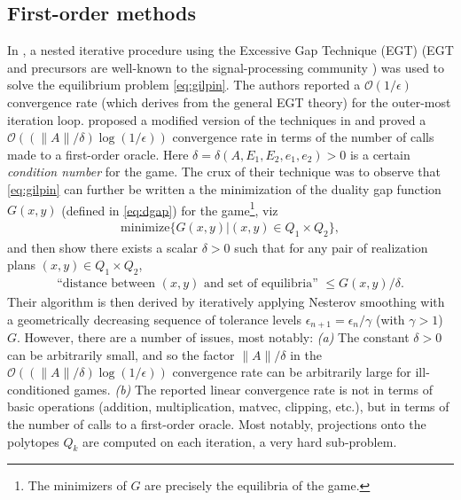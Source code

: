 \documentclass[a4paper,9pt]{extarticle}
\begin{document}
\subsection{First-order methods}
In \cite{hoda2010smoothing}, a nested iterative procedure using the
Excessive Gap Technique (EGT) \cite{nesterov2005excessive} (EGT and
precursors are well-known to the signal-processing community
\cite{NESTA}) was used
to solve the equilibrium problem \eqref{eq:gilpin}.
The authors reported a $\mathcal{O}(1/\epsilon)$ convergence rate
(which derives from the general EGT theory) for the outer-most
iteration loop.
\cite{gilpinfirst} proposed a modified version of the techniques in
\cite{hoda2010smoothing} and  proved a $\mathcal{O}\left(\left(\|A\| /
\delta\right) \log \left(1 / \epsilon\right)\right)$ convergence rate in
terms of the number of calls made to a first-order oracle. Here
$\delta = \delta(A, E_1, E_2, e_1, e_2) > 0$ is a certain
\textit{condition number} for the game. The crux of their technique was to
observe that \eqref{eq:gilpin} can further be written a the minimization of
the duality gap function $G(x, y)$ (defined in \eqref{eq:dgap})
for the game\footnote{The minimizers of $G$ are precisely the
  equilibria of the game.}, viz
\begin{eqnarray}
\mathrm{minimize}\{G(x,y)|(x,y) \in Q_1 \times Q_2\},
\end{eqnarray}
and then show there exists a scalar
$\delta > 0$ such that for any pair of realization plans $(x, y) \in Q_1 \times Q_2$,
\begin{eqnarray}
\text{``distance between }(x, y)\text{ and set of
equilibria'' } \le G(x, y)/\delta.
\end{eqnarray}
Their
algorithm is then derived by iteratively applying Nesterov smoothing
\cite{nesterov2005a}
with a geometrically decreasing sequence of tolerance levels
$\epsilon_{n+1} = \epsilon_n / \gamma$ (with $\gamma > 1$)
$G$. However, there are a number of issues, most notably: \textit{(a)}
The constant $\delta > 0$ can be arbitrarily small, and so the factor
$\|A\| / \delta$ in the $\mathcal{O}\left(\left(\|A\| / \delta\right)
\log\left(1 / \epsilon\right)\right)$ convergence rate can be
arbitrarily large for ill-conditioned games.
\textit{(b)} The reported linear convergence rate is not in terms of
  basic operations (addition, multiplication, matvec, clipping, etc.),
  but in terms of the number of calls to a first-order oracle. Most
  notably, projections onto the polytopes $Q_k$ are computed on
  each iteration, a very hard sub-problem. %
\end{document}

